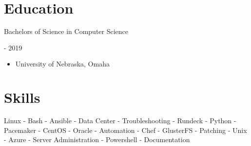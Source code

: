 \documentclass[10pt, a4paper]{article}
\begin{document}
\section*{Education}
    \begin{minipage}{0.5\textwidth} %
        \raggedright %
        Bachelors of Science in Computer Science
      \end{minipage}
      \begin{minipage}{0.5\textwidth} %
         \-- 2019
      \end{minipage}
      \begin{itemize}
      \item University of Nebraska, Omaha
    \end{itemize}

\section*{Skills}
Linux - Bash - Ansible - Data Center - Troubleshooting - Rundeck - Python - Pacemaker - CentOS - Oracle - Automation - Chef - GlusterFS - Patching - Unix - Azure - Server Administration - Powershell - Documentation
\end{document}
